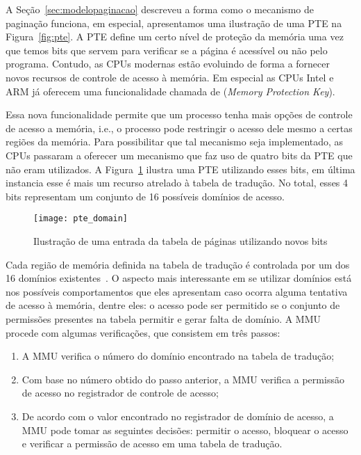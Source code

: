A Seção~\ref{sec:modelopaginacao} descreveu a forma como o mecanismo de
paginação funciona, em especial, apresentamos uma ilustração de uma PTE na
Figura~\ref{fig:pte}. A PTE define um certo nível de proteção da memória uma
vez que temos bits que servem para verificar se a página é acessível ou não
pelo programa. Contudo, as CPUs modernas estão evoluindo de forma a fornecer
novos recursos de controle de acesso à memória. Em especial as CPUs Intel e ARM
já oferecem uma funcionalidade chamada de  (\emph{Memory Protection Key}).

Essa nova funcionalidade permite que um processo tenha mais opções de controle
de acesso a memória, i.e., o processo pode restringir o acesso dele mesmo a
certas regiões da memória. Para possibilitar que tal mecanismo seja
implementado, as CPUs passaram a oferecer um mecanismo que faz uso de quatro
bits da PTE que não eram utilizados. A Figura~\ref{fig:ptedominio} ilustra uma
PTE utilizando esses bits, em última instancia esse é mais um recurso atrelado
à tabela de tradução. No total, esses 4 bits representam um conjunto de 16
possíveis domínios de acesso. 

\begin{figure}[!h]
  \centering
  \texttt{[image: pte\_domain]} 
  \caption{Ilustração de uma entrada da tabela de páginas utilizando novos bits}
  \label{fig:ptedominio} 
\end{figure}

Cada região de memória definida na tabela de tradução é controlada por um dos
16 domínios existentes~\citep{armdeveloperguide}.  O aspecto mais interessante
em se utilizar domínios está nos possíveis comportamentos que eles apresentam
caso ocorra alguma tentativa de acesso à memória, dentre eles: o acesso pode
ser permitido se o conjunto de permissões presentes na tabela permitir e gerar
falta de domínio. A MMU procede com algumas verificações, que consistem em três
passos:

\begin{enumerate}
  \item A MMU verifica o número do domínio encontrado na tabela de tradução;
  \item Com base no número obtido do passo anterior, a MMU verifica a permissão
        de acesso no registrador de controle de acesso;
  \item De acordo com o valor encontrado no registrador de domínio de acesso, a
        MMU pode tomar as seguintes decisões: permitir o acesso, bloquear o
        acesso e verificar a permissão de acesso em uma tabela de tradução.
\end{enumerate}

